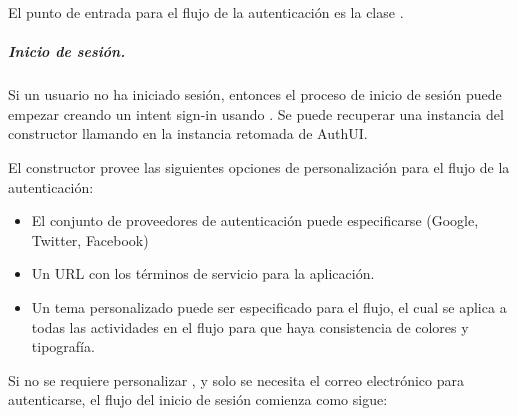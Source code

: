 El punto de entrada para el flujo de la autenticación es la clase
.


\subparagraph{Inicio de sesión.}
\label{\detokenize{dev_docs:inicio-de-sesion}}
Si un usuario no ha iniciado sesión, entonces el proceso de inicio de sesión
puede empezar creando un intent sign-in usando .
Se puede recuperar una instancia del constructor llamando
 en la instancia retomada de AuthUI.

El constructor provee las siguientes opciones de personalización para el flujo
de la autenticación:
\begin{itemize}
\item {} 
El conjunto de proveedores de autenticación puede especificarse (Google, Twitter, Facebook)

\item {} 
Un URL con los términos de servicio para la aplicación.

\item {} 
Un tema personalizado puede ser especificado para el flujo, el cual se aplica a todas las actividades en el flujo para que haya consistencia de colores y tipografía.

\end{itemize}

Si no se requiere personalizar , y solo se necesita el correo electrónico para
autenticarse, el flujo del inicio de sesión comienza como sigue:

%
\begin{sphinxVerbatim}[commandchars=\\\{\}]
      


\end{sphinxVerbatim}

